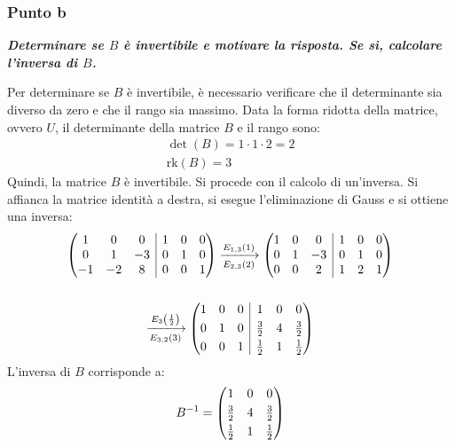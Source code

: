 \documentclass[a4paper]{article}
\makeatletter
\newenvironment{rowequmat}[1]{\left(\array{@{}#1@{}}}{\endarray\right)}
\makeatother
\begin{document}
	\subsubsection{Punto b}
	
	\textcolor{Green4}{\textbf{\emph{Determinare se $B$ è invertibile e motivare la risposta. Se sì, calcolare l'inversa di $B$.}}}\newline

	\noindent
	Per determinare se $B$ è invertibile, è necessario verificare che il determinante sia diverso da zero e che il rango sia massimo. Data la forma ridotta della matrice, ovvero $U$, il determinante della matrice $B$ e il rango sono:
	\begin{gather*}
		\det\left(B\right) = 1 \cdot 1 \cdot 2 = 2 \\
		\mathrm{rk}\left(B\right) = 3
	\end{gather*}
	Quindi, la matrice $B$ è invertibile. Si procede con il calcolo di un'inversa. Si affianca la matrice identità a destra, si esegue l'eliminazione di Gauss e si ottiene una inversa:
	\begin{gather*}
		\begin{rowequmat}{ccc|ccc}
			1 & 0 & 0 	& 1 & 0 & 0 \\
			0 & 1 & -3 	& 0 & 1 & 0 \\
			-1 & -2 & 8 & 0 & 0 & 1
		\end{rowequmat}
		\xlongrightarrow[E_{2,3}\left(2\right)]{E_{1,3}\left(1\right)}
		\begin{rowequmat}{ccc|ccc}
			1 & 0 	& 0 	& 1 & 0 & 0 \\
			0 & 1 	& -3 	& 0 & 1 & 0 \\
			0 & 0 	& 2 	& 1 & 2 & 1
		\end{rowequmat}\\
		\\
		\xlongrightarrow[E_{3,2}\left(3\right)]{E_{3}\left(\frac{1}{2}\right)}
		\begin{rowequmat}{ccc|ccc}
			1 & 0 	& 0 	& 1 & 0 & 0 \\ [.3em]
			0 & 1 	& 0 	& \frac{3}{2} & 4 & \frac{3}{2} \\ [.3em]
			0 & 0 	& 1 	& \frac{1}{2} & 1 & \frac{1}{2}
		\end{rowequmat}
	\end{gather*}
	L'inversa di $B$ corrisponde a:
	\begin{equation*}
		B^{-1} = \begin{rowequmat}{ccc}
			1 & 0 & 0 \\ [.3em]
			\frac{3}{2} & 4 & \frac{3}{2} \\ [.3em]
			\frac{1}{2} & 1 & \frac{1}{2}
		\end{rowequmat}
	\end{equation*}\newpage
	
\end{document}

